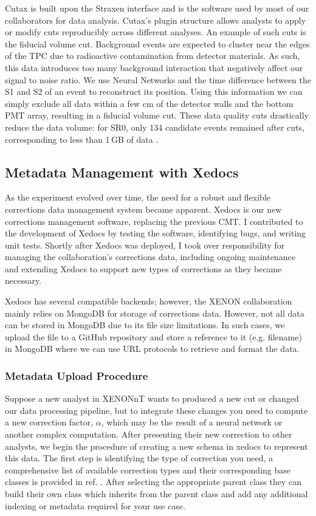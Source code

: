 Cutax is built upon the Straxen interface and is the software used by most of our collaborators for data analysis. Cutax’s plugin structure allows analysts to apply or modify cuts reproducibly across different analyses. An example of such cuts is the fiducial volume cut. Background events are expected to cluster near the edges of the TPC due to radioactive contamination from detector materials. As such, this data introduces too many background interaction that negatively affect our signal to noise ratio. We use Neural Networks and the time difference between the S1 and S2 of an event to reconstruct its position. Using this information we can simply exclude all data within a few cm of the detector walls and the bottom PMT array, resulting in a fiducial volume cut. These data quality cuts drastically reduce the data volume: for SR0, only 134 candidate events remained after cuts, corresponding to less than 1\,GB of data \cite{PhysRevLett.131.041003}. 

\subsection{Metadata Management with Xedocs}

As the experiment evolved over time, the need for a robust and flexible corrections data management system became apparent. Xedocs is our new corrections management software, replacing the previous CMT. I contributed to the development of Xedocs by testing the software, identifying bugs, and writing unit tests. Shortly after Xedocs was deployed, I took over responsibility for managing the collaboration’s corrections data, including ongoing maintenance and extending Xedocs to support new types of corrections as they became necessary.

Xedocs has several compatible backends; however, the XENON collaboration mainly relies on MongoDB for storage of corrections data. However, not all data can be stored in MongoDB due to its file size limitations. In such cases, we upload the file to a GitHub repository and store a reference to it (e.g. filename) in MongoDB where we can use URL protocols to retrieve and format the data.

\subsubsection*{Metadata Upload Procedure}

Suppose a new analyst in XENONnT wants to produced a new cut or changed our data processing pipeline, but to integrate these changes you need to compute a new correction factor, $\alpha$, which may be the result of a neural network or another complex computation. After presenting their new correction to other analysts, we begin the procedure of creating a new schema in xedocs to represent this data. The first step is identifying the type of correction you need, a comprehensive list of available correction types and their corresponding base classes is provided in ref. \pageref{xedocs_paper}. After selecting the appropriate parent class they can build their own class which inherits from the parent class and add any additional indexing or metadata required for your use case.

